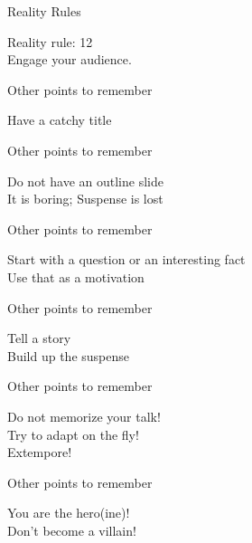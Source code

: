 \documentclass{beamer}
\newcommand{\RR}[1]{\color{white}\Huge{Reality rule: #1}\\}
\newcommand{\RRS}{\color{white}Reality Rules}
\begin{document}
\begin{frame}{\RRS}
	\begin{center}
		\RR{12}
		\Huge{Engage your audience.}
	\end{center}
\end{frame}

\begin{frame}{\color{white}Other points to remember}
	\begin{center}
		\color{white}\Huge{Have a catchy title}
	\end{center}
\end{frame}

\begin{frame}{\color{white}Other points to remember}
	\begin{center}
		\color{white}\Huge{Do not have an outline slide}\\
		\color{white}\Huge{It is boring; Suspense is lost}
	\end{center}
\end{frame}

\begin{frame}{\color{white}Other points to remember}
	\begin{center}
		\color{white}\Huge{Start with a question or an interesting fact}\\
		\pause
		\Huge{Use that as a motivation}
	\end{center}
\end{frame}

\begin{frame}{\color{white}Other points to remember}
	\begin{center}
		\color{white}
		\Huge{Tell a story}\\
		\Huge{Build up the suspense}
	\end{center}
\end{frame}



\begin{frame}{\color{white}Other points to remember}
	\begin{center}
		\color{white}
		\Huge{Do not memorize your talk!}\\
		\pause
		\Huge{Try to adapt on the fly!}\\
		\pause
		\Huge{Extempore!}
	\end{center}
\end{frame}

\begin{frame}{\color{white}Other points to remember}
	\begin{center}
		\color{white}
		\Huge{You are the hero(ine)!}\\
		\pause
		\Huge{Don't become a villain!}
	\end{center}
\end{frame}
\end{document}
